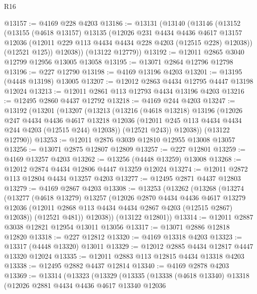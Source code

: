 \begin{lexlean}{R16}
\begin{coremodule}
@13157 := @4169 @228 @4203
@13186 := @13131
    (@13140
      (@13146
        (@13152
          (@13155
            (@4618 @13157)
            @13135
            (@12026
              @231
              @4434
              @4436
              @4617
              @13157
              @12036
              (@12011 @229 @113 @4434 @4434 @228 @4203 (@12515 @228) @12038))
            (@12521 @125))
          @12038))
      (@13122 @12779))
@13192 := @12011 @2865 @3040 @12799 @12956 @13005 @13058
@13195 := @13071 @2864 @12796 @12798
@13196 := @227 @12790
@13198 := @4169 @13196 @4203
@13201 := @13195 (@4448 @13198) @13005
@13207 := @12012 @2863 @4434 @12795 @4447 @13198 @12024
@13213 := @12011 @2861 @113 @12793 @4434 @13196 @4203
@13216 := @12495 @2860 @4437 @12792
@13218 := @4169 @244 @4203
@13247 := @13192
    (@13201
      (@13207
        (@13213
          (@13216
            (@4618 @13218)
            @13196
            (@12026
              @247
              @4434
              @4436
              @4617
              @13218
              @12036
              (@12011 @245 @113 @4434 @4434 @244 @4203 (@12515 @244) @12038))
            (@12521 @243))
          @12038))
      (@13122 @12790))
@13253 := @12011 @2876 @3039 @12810 @12955 @13008 @13057
@13256 := @13071 @2875 @12807 @12809
@13257 := @227 @12801
@13259 := @4169 @13257 @4203
@13262 := @13256 (@4448 @13259) @13008
@13268 := @12012 @2874 @4434 @12806 @4447 @13259 @12024
@13274 := @12011 @2872 @113 @12804 @4434 @13257 @4203
@13277 := @12495 @2871 @4437 @12803
@13279 := @4169 @2867 @4203
@13308 := @13253
    (@13262
      (@13268
        (@13274
          (@13277
            (@4618 @13279)
            @13257
            (@12026
              @2870
              @4434
              @4436
              @4617
              @13279
              @12036
              (@12011 @2868 @113 @4434 @4434 @2867 @4203 (@12515 @2867) @12038))
            (@12521 @481))
          @12038))
      (@13122 @12801))
@13314 := @12011 @2887 @3038 @12821 @12954 @13011 @13056
@13317 := @13071 @2886 @12818 @12820
@13318 := @227 @12812
@13320 := @4169 @13318 @4203
@13323 := @13317 (@4448 @13320) @13011
@13329 := @12012 @2885 @4434 @12817 @4447 @13320 @12024
@13335 := @12011 @2883 @113 @12815 @4434 @13318 @4203
@13338 := @12495 @2882 @4437 @12814
@13340 := @4169 @2878 @4203
@13369 := @13314
    (@13323
      (@13329
        (@13335
          (@13338
            (@4618 @13340)
            @13318
            (@12026
              @2881
              @4434
              @4436
              @4617
              @13340
              @12036

\end{coremodule}
\end{lexlean}

